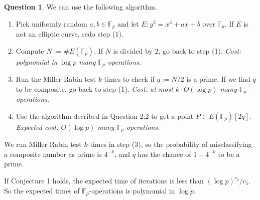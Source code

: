 \documentclass{article}
\newcommand{\F}{\mathbb{F}}
\theoremstyle{definition}
\newtheorem{question}{Question}[section]
\begin{document}
\begin{question}
    We can use the following algorithm.
    \begin{enumerate}[(1)]
        \item Pick uniformly random $a, b\in\F_p$ and let $E : y^2 = x^3 + ax + b$ over $\F_p$. If $E$ is not an elliptic curve, redo step (1).
        \item Compute $N := \# E(\F_p)$. If $N$ is divided by $2$, go back to step (1). \textit{Cost: polynomial in $\log p$ many $\F_p$-operations.}
        \item Run the Miller-Rabin test $k$-times to check if $q := N/2$ is a prime. If we find $q$ to be composite, go back to step (1).
        \textit{Cost: at most $k\cdot O(\log p)$ many $\F_p$-operations.}
        \item Use the algorithm decribed in Question 2.2 to get a point $P\in E(\F_p)[2q]$. \textit{Expected cost: $O(\log p)$ many $\F_p$-operations.}
    \end{enumerate}
    We run Miller-Rabin test $k$-times in step (3),
    so the probability of misclassifying a composite number as prime is $4^{-k}$,
    and $q$ has the chance of $1 - 4^{-k}$ to be a prime.

    If Conjecture 1 holds, the expected time of iterations is less than $(\log p)^{c_2}/c_1$.
    So the expected times of $\F_p$-operations is polynomial in $\log p$.
\end{question}
\end{document}

